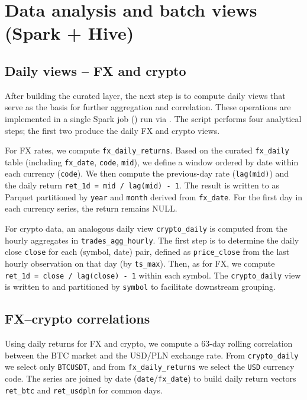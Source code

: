 \documentclass{article}
\begin{document}
\section{Data analysis and batch views (Spark + Hive)}

\subsection{Daily views -- FX and crypto}

After building the curated layer, the next step is to compute daily views
that serve as the basis for further aggregation and correlation. These
operations are implemented in a single Spark job
() run via
. The script performs four analytical
steps; the first two produce the daily FX and crypto views.

For FX rates, we compute \texttt{fx\_daily\_returns}. Based on the curated
\texttt{fx\_daily} table (including \texttt{fx\_date}, \texttt{code},
\texttt{mid}), we define a window ordered by date within each currency
(\texttt{code}). We then compute the previous-day rate
(\texttt{lag(mid)}) and the daily return
\texttt{ret\_1d = mid / lag(mid) - 1}. The result is written to
 as Parquet
partitioned by \texttt{year} and \texttt{month} derived from
\texttt{fx\_date}. For the first day in each currency series, the return
remains NULL.

For crypto data, an analogous daily view \texttt{crypto\_daily} is
computed from the hourly aggregates in \texttt{trades\_agg\_hourly}. The
first step is to determine the daily close \texttt{close} for each
(symbol, date) pair, defined as \texttt{price\_close} from the last hourly
observation on that day (by \texttt{ts\_max}). Then, as for FX, we compute
\texttt{ret\_1d = close / lag(close) - 1} within each symbol. The
\texttt{crypto\_daily} view is written to
 and partitioned by
\texttt{symbol} to facilitate downstream grouping.

\subsection{FX--crypto correlations}

Using daily returns for FX and crypto, we compute a 63-day rolling
correlation between the BTC market and the USD/PLN exchange rate. From
\texttt{crypto\_daily} we select only \texttt{BTCUSDT}, and from
\texttt{fx\_daily\_returns} we select the \texttt{USD} currency code. The
series are joined by date (\texttt{date}/\texttt{fx\_date}) to build daily
return vectors \texttt{ret\_btc} and \texttt{ret\_usdpln} for common days.
\end{document}
